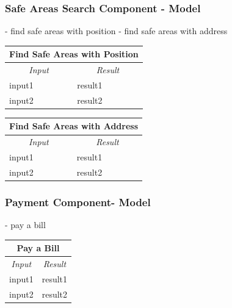 \documentclass[english]{article}
\begin{document}
\subsubsection{Safe Areas Search Component - Model}
- find safe areas with position
- find safe areas with address

\begin{center}

	\begin{tabular}{ | p{6cm} | p{6cm} | }
		\hline 


		\hline

		\multicolumn{2}{|c|}{\textbf{Find Safe Areas with Position}} \\
		\hline
		\multicolumn{1}{|c|}{\textit{Input}} & \multicolumn{1}{c|}{\textit{Result}} \\
		\hline
		input1 & result1 \\
		\hline
		input2 & result2 \\
		\hline
	\end{tabular}
\end{center}

\begin{center}

	\begin{tabular}{ | p{6cm} | p{6cm} | }
		\hline 


		\hline

		\multicolumn{2}{|c|}{\textbf{Find Safe Areas with Address}} \\
		\hline
		\multicolumn{1}{|c|}{\textit{Input}} & \multicolumn{1}{c|}{\textit{Result}} \\
		\hline
		input1 & result1 \\
		\hline
		input2 & result2 \\
		\hline
	\end{tabular}
\end{center}

\subsubsection{Payment Component- Model}
- pay a bill 

\begin{center}

	\begin{tabular}{ | p{6cm} | p{6cm} | }
		\hline 


		\hline

		\multicolumn{2}{|c|}{\textbf{Pay a Bill}} \\
		\hline
		\multicolumn{1}{|c|}{\textit{Input}} & \multicolumn{1}{c|}{\textit{Result}} \\
		\hline
		input1 & result1 \\
		\hline
		input2 & result2 \\
		\hline
	\end{tabular}
\end{center}
\end{document}
